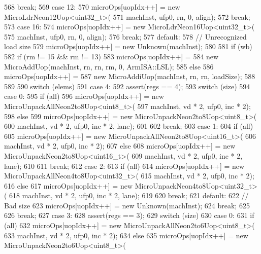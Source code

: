 \begin{DoxyCode}
{{568         break;
569       case 12:
570         microOps[uopIdx++] = new MicroLdrNeon12Uop<uint32_t>(
571                 machInst, ufp0, rn, 0, align);
572         break;
573       case 16:
574         microOps[uopIdx++] = new MicroLdrNeon16Uop<uint32_t>(
575                 machInst, ufp0, rn, 0, align);
576         break;
577       default:
578         // Unrecognized load size
579         microOps[uopIdx++] = new Unknown(machInst);
580     }
581     if (wb) {
582         if (rm != 15 && rm != 13) {
583             microOps[uopIdx++] =
584                 new MicroAddUop(machInst, rn, rn, rm, 0, ArmISA::LSL);
585         } else {
586             microOps[uopIdx++] =
587                 new MicroAddiUop(machInst, rn, rn, loadSize);
588         }
589     }
590     switch (elems) {
591       case 4:
592         assert(regs == 4);
593         switch (size) {
594           case 0:
595             if (all) {
596                 microOps[uopIdx++] = new MicroUnpackAllNeon2to8Uop<uint8_t>(
597                         machInst, vd * 2, ufp0, inc * 2);
598             } else {
599                 microOps[uopIdx++] = new MicroUnpackNeon2to8Uop<uint8_t>(
600                         machInst, vd * 2, ufp0, inc * 2, lane);
601             }
602             break;
603           case 1:
604             if (all) {
605                 microOps[uopIdx++] = new MicroUnpackAllNeon2to8Uop<uint16_t>(
606                         machInst, vd * 2, ufp0, inc * 2);
607             } else {
608                 microOps[uopIdx++] = new MicroUnpackNeon2to8Uop<uint16_t>(
609                         machInst, vd * 2, ufp0, inc * 2, lane);
610             }
611             break;
612           case 2:
613             if (all) {
614                 microOps[uopIdx++] = new MicroUnpackAllNeon4to8Uop<uint32_t>(
615                         machInst, vd * 2, ufp0, inc * 2);
616             } else {
617                 microOps[uopIdx++] = new MicroUnpackNeon4to8Uop<uint32_t>(
618                         machInst, vd * 2, ufp0, inc * 2, lane);
619             }
620             break;
621           default:
622             // Bad size
623             microOps[uopIdx++] = new Unknown(machInst);
624             break;
625         }
626         break;
627       case 3:
628         assert(regs == 3);
629         switch (size) {
630           case 0:
631             if (all) {
632                 microOps[uopIdx++] = new MicroUnpackAllNeon2to6Uop<uint8_t>(
633                         machInst, vd * 2, ufp0, inc * 2);
634             } else {
635                 microOps[uopIdx++] = new MicroUnpackNeon2to6Uop<uint8_t>(
}}}}
\end{DoxyCode}
